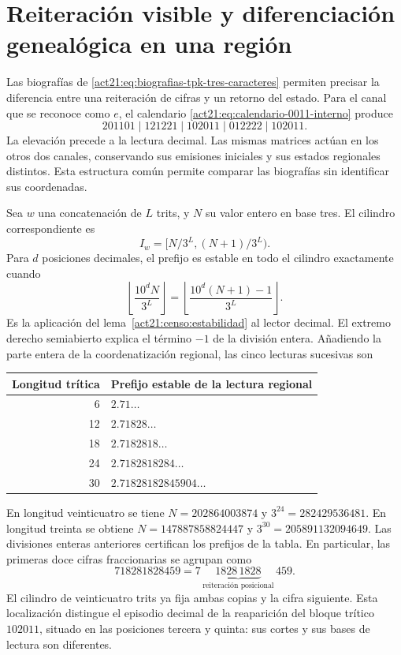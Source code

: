 \section{Reiteración visible y diferenciación genealógica en una región}
\label{md:ejemplo:region}
Las biografías de \eqref{act21:eq:biografias-tpk-tres-caracteres}
permiten precisar la diferencia entre una reiteración de cifras y un
retorno del estado. Para el canal que se reconoce como \(e\), el
calendario \eqref{act21:eq:calendario-0011-interno} produce
\[
 201101\mid121221\mid102011\mid012222\mid102011.
\]
La elevación precede a la lectura decimal. Las mismas matrices actúan
en los otros dos canales, conservando sus emisiones iniciales y sus
estados regionales distintos. Esta estructura común permite comparar
las biografías sin identificar sus coordenadas.

Sea \(w\) una concatenación de \(L\) trits, y \(N\) su valor entero
en base tres. El cilindro correspondiente es
\[
 I_w=[N/3^L,(N+1)/3^L).
\]
Para \(d\) posiciones decimales, el prefijo es estable en todo el
cilindro exactamente cuando
\[
 \left\lfloor\frac{10^dN}{3^L}\right\rfloor
 =\left\lfloor\frac{10^d(N+1)-1}{3^L}\right\rfloor.
\]
Es la aplicación del lema~\ref{act21:censo:estabilidad} al lector
decimal. El extremo derecho semiabierto explica el término \(-1\)
de la división entera. Añadiendo la parte entera de la coordenatización regional,
las cinco lecturas sucesivas son
\begin{center}
\begin{tabular}{@{}rl@{}}
\toprule
Longitud trítica & Prefijo estable de la lectura regional\\
\midrule
6 & \(2.71\ldots\)\\
12 & \(2.71828\ldots\)\\
18 & \(2.7182818\ldots\)\\
24 & \(2.7182818284\ldots\)\\
30 & \(2.71828182845904\ldots\)\\
\bottomrule
\end{tabular}
\end{center}
En longitud veinticuatro se tiene
\(N=202864003874\) y \(3^{24}=282429536481\).
En longitud treinta se obtiene
\(N=147887858824447\) y \(3^{30}=205891132094649\).
Las divisiones enteras anteriores certifican los prefijos de la tabla.
En particular, las primeras doce cifras fraccionarias se agrupan como
\[
 718281828459
 =7\,\underbrace{1828\,1828}_{\text{reiteración posicional}}\,459.
\]
El cilindro de veinticuatro trits ya fija ambas copias y la cifra
siguiente. Esta localización distingue el episodio decimal de la
reaparición del bloque trítico \(102011\), situado en las posiciones
tercera y quinta: sus cortes y sus bases de lectura son diferentes.

